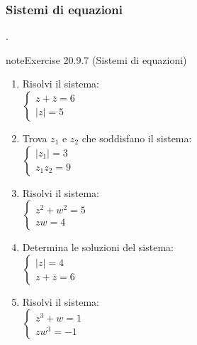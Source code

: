 \documentclass[letterpaper,10pt,italian]{jupyterBook}
\begin{document}
\subsubsection{Sistemi di equazioni}
\label{\detokenize{ch/algebra/complex-algebra-problems:sistemi-di-equazioni}}\label{\detokenize{ch/algebra/complex-algebra-problems:math-hs-algebra-complex-problems-equations-sys}}
\sphinxAtStartPar
{\hyperref[\detokenize{ch/algebra/complex-algebra-sol:math-hs-algebra-complex-sol-equations-sys-sol}]{}}.
 \label{exercise:ch/algebra/complex-algebra-problems-exercise-6}

\begin{sphinxadmonition}{note}{Exercise 20.9.7 (Sistemi di equazioni)}


\begin{enumerate}
%
\item {} 
\sphinxAtStartPar
Risolvi il sistema:\\
\(\begin{cases} 
z + \overline{z} = 6 \\
|z| = 5 
\end{cases}\)

\item {} 
\sphinxAtStartPar
Trova \(z_1\) e \(z_2\) che soddisfano il sistema:\\
\(\begin{cases} 
|z_1| = 3 \\
z_1 z_2 = 9 
\end{cases}\)

\item {} 
\sphinxAtStartPar
Risolvi il sistema:\\
\(\begin{cases} 
z^2 + w^2 = 5 \\
z w = 4 
\end{cases}\)

\item {} 
\sphinxAtStartPar
Determina le soluzioni del sistema:\\
\(\begin{cases} 
|z| = 4 \\
z + \overline{z} = 6 
\end{cases}\)

\item {} 
\sphinxAtStartPar
Risolvi il sistema:\\
\(\begin{cases} 
z^3 + w = 1 \\
z w^3 = -1 
\end{cases}\)


\end{enumerate}
\end{sphinxadmonition}
\end{document}
